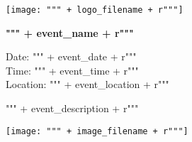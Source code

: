 \documentclass{article}
\begin{document}
\begin{center}
    \texttt{[image: """ + logo\_filename + r"""]}
    \vspace{0.5cm}

    \LARGE \textbf{""" + event_name + r"""}

    \vspace{0.3cm}
    \normalsize Date: """ + event_date + r""" \\
    Time: """ + event_time + r""" \\
    Location: """ + event_location + r"""
\end{center}

\vspace{1cm}

""" + event_description + r"""

\vspace{1cm}
\begin{center}
    \texttt{[image: """ + image\_filename + r"""]}
\end{center}
\end{document}
